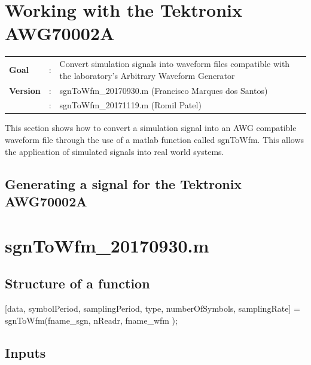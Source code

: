 \clearpage
\section{Working with the Tektronix AWG70002A}

\begin{tcolorbox}	
	\begin{tabular}{p{2.75cm} p{0.2cm} p{10.5cm}} 	
		\textbf{Goal}           &:& Convert simulation signals into waveform files compatible with the laboratory's Arbitrary Waveform Generator\\
		\textbf{Version}        &:& sgnToWfm\_20170930.m (Francisco Marques dos Santos)\\
							    &:& sgnToWfm\_20171119.m (Romil Patel)
	\end{tabular}
\end{tcolorbox}


This section shows how to convert a simulation signal into an AWG compatible waveform file through the use of a matlab function called sgnToWfm. This allows the application of simulated signals into real world systems.
\subsection{Generating a signal for the Tektronix AWG70002A}

\section*{sgnToWfm\_20170930.m}

\subsection*{Structure of a function}

[data, symbolPeriod, samplingPeriod, type, numberOfSymbols, samplingRate] = sgnToWfm(fname\_sgn, nReadr, fname\_wfm );

\subsection*{Inputs}

